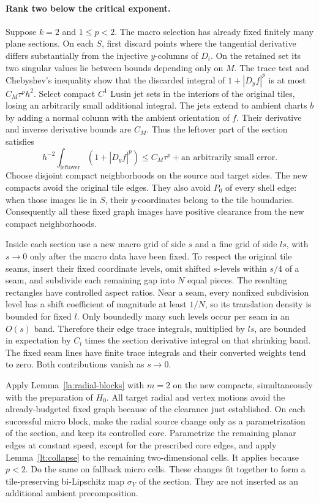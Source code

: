 \documentclass[11pt]{article}
\numberwithin{equation}{section}
\theoremstyle{definition}
\theoremstyle{remark}
\begin{document}
\paragraph{Rank two below the critical exponent.}
Suppose $k=2$ and $1\le p<2$.  The macro selection has already fixed
finitely many plane sections.  On each $S$, first discard points
where the tangential derivative differs substantially from the
injective $y$-columns of $D_i$.  On the retained set its two singular
values lie between bounds depending only on $M$.  The trace test and
Chebyshev's inequality show that the discarded integral of
$1+|D_yf|^p$ is at most $C_M\tau^p h^2$.  Select compact $C^1$ Lusin
jet sets in the interiors of the original tiles, losing an
arbitrarily small additional integral.  The jets extend to ambient
charts $b$ by adding a normal column with the ambient orientation of
$f$.  Their derivative and inverse derivative bounds are $C_M$.
Thus the leftover part of the section satisfies
\begin{equation}\label{la:section-leftover}
 h^{-2}\int_{\text{leftover}}(1+|D_yf|^p)
       \le C_M\tau^p+\text{an arbitrarily small error}.
\end{equation}
Choose disjoint compact neighborhoods on the source and target sides.
The new compacts avoid the original tile edges.  They also avoid
$P_0$ of every shell edge: when those images lie in $S$, their
$y$-coordinates belong to the tile boundaries.  Consequently all
these fixed graph images have positive clearance from the new
compact neighborhoods.

Inside each section use a new macro grid of side $s$ and a fine grid
of side $ls$, with $s\to0$ only after the macro data have been fixed.
To respect the original tile seams, insert their fixed coordinate
levels, omit shifted $s$-levels within $s/4$ of a seam, and subdivide
each remaining gap into $N$ equal pieces.  The resulting rectangles
have controlled aspect ratios.  Near a seam, every nonfixed
subdivision level has a shift coefficient of magnitude at least
$1/N$, so its translation density is bounded for fixed $l$.
Only boundedly many such levels occur per seam in an $O(s)$ band.
Therefore their edge trace integrals, multiplied by $ls$, are bounded
in expectation by $C_l$ times the section derivative integral on
that shrinking band.  The fixed seam lines have finite trace
integrals and their converted weights tend to zero.  Both
contributions vanish as $s\to0$.

Apply Lemma~\ref{la:radial-blocks} with $m=2$ on the new compacts,
simultaneously with the preparation of $H_0$.  All target radial and
vertex motions avoid the already-budgeted fixed graph because of the
clearance just established.  On each successful micro block, make
the radial source change only as a parametrization of the section,
and keep its controlled core.  Parametrize the remaining planar
edges at constant speed, except for the prescribed core edges, and
apply Lemma~\ref{lt:collapse} to the remaining two-dimensional cells.
It applies because $p<2$.  Do the same on fallback micro cells.
These changes fit together to form a tile-preserving bi-Lipschitz
map $\sigma_Y$ of the section.  They are not inserted as an
additional ambient precomposition.
\end{document}
